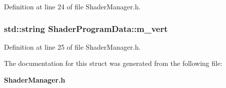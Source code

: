 Definition at line 24 of file Shader\-Manager.\-h.

\subsubsection[{m\-\_\-vert}]{\setlength{\rightskip}{0pt plus 5cm}std\-::string Shader\-Program\-Data\-::m\-\_\-vert}\label{struct_shader_program_data_a2afca420d01ef8d62dc762dbd922a9d0}


Definition at line 25 of file Shader\-Manager.\-h.



The documentation for this struct was generated from the following file\-:\begin{DoxyCompactItemize}
\item 
{\bf Shader\-Manager.\-h}\end{DoxyCompactItemize}
